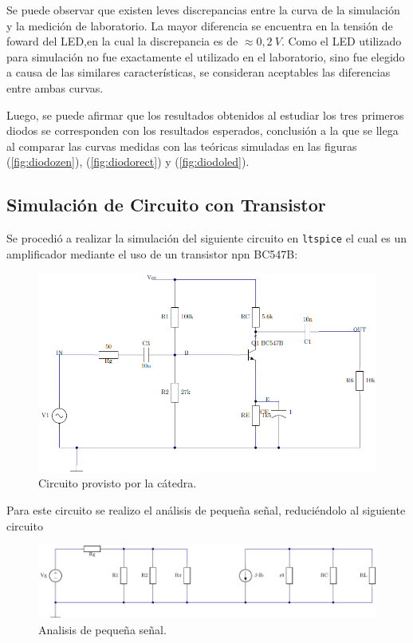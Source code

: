 \documentclass[a4paper]{article}
\begin{document}
Se puede observar que existen leves discrepancias entre la curva de la simulación y la medición de laboratorio. La mayor diferencia se encuentra en la tensión de foward del LED,en  la cual la discrepancia es de $\approx 0,2 \ V$.
Como el LED utilizado para simulación no fue exactamente el utilizado en el laboratorio, sino fue elegido a causa de las similares características, se consideran aceptables las diferencias entre ambas curvas.

Luego, se puede afirmar que los resultados obtenidos al estudiar los tres primeros diodos se corresponden con los resultados esperados, conclusión a la que se llega al comparar las curvas medidas con las teóricas simuladas en las figuras (\ref{fig:diodozen}), (\ref{fig:diodorect}) y (\ref{fig:diodoled}).

\subsection*{Simulación de Circuito con Transistor}

Se procedió a realizar la simulación del siguiente circuito en \texttt{ltspice} el cual es un amplificador mediante el uso de un transistor npn BC547B:
\begin{figure}[H]
	\centering
	\includegraphics[width=0.6 \textwidth]{BC547B.PNG}	
	\caption{Circuito provisto por la cátedra.}
	\label{fig:cmnemitnpn}

\end{figure}

Para este circuito se realizo el análisis de pequeña señal, reduciéndolo al siguiente circuito
\begin{figure}[H]
	\centering
	\includegraphics[width=1 \textwidth]{CircEq.PNG}	
	\caption{Analisis de pequeña señal.}
	\label{fig:littleSignal}
\end{figure}
\end{document}
